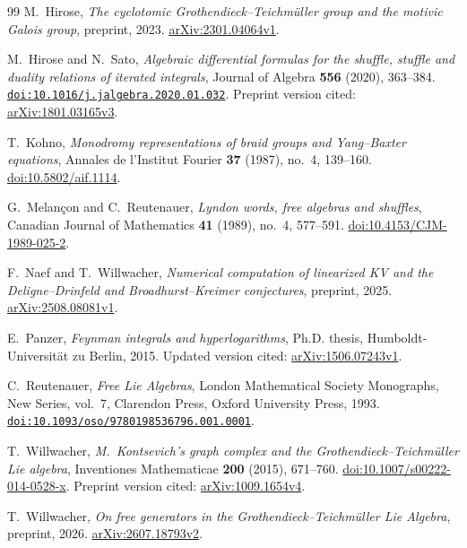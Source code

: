 \begin{thebibliography}{99}
M.~Hirose,
\emph{The cyclotomic Grothendieck--Teichm\"uller group and the motivic
Galois group},
preprint, 2023.
\href{https://arxiv.org/abs/2301.04064v1}{arXiv:2301.04064v1}.

M.~Hirose and N.~Sato,
\emph{Algebraic differential formulas for the shuffle, stuffle and duality
relations of iterated integrals},
Journal of Algebra \textbf{556} (2020), 363--384.
\href{https://doi.org/10.1016/j.jalgebra.2020.01.032}{\nolinkurl{doi:10.1016/j.jalgebra.2020.01.032}}.
Preprint version cited:
\href{https://arxiv.org/abs/1801.03165v3}{arXiv:1801.03165v3}.

T.~Kohno,
\emph{Monodromy representations of braid groups and Yang--Baxter equations},
Annales de l'Institut Fourier \textbf{37} (1987), no.~4, 139--160.
\href{https://doi.org/10.5802/aif.1114}{doi:10.5802/aif.1114}.

G.~Melan\c{c}on and C.~Reutenauer,
\emph{Lyndon words, free algebras and shuffles},
Canadian Journal of Mathematics \textbf{41} (1989), no.~4, 577--591.
\href{https://doi.org/10.4153/CJM-1989-025-2}{doi:10.4153/CJM-1989-025-2}.

F.~Naef and T.~Willwacher,
\emph{Numerical computation of linearized KV and the Deligne--Drinfeld and
Broadhurst--Kreimer conjectures},
preprint, 2025.
\href{https://arxiv.org/abs/2508.08081v1}{arXiv:2508.08081v1}.

E.~Panzer,
\emph{Feynman integrals and hyperlogarithms},
Ph.D. thesis, Humboldt-Universit\"at zu Berlin, 2015.
Updated version cited:
\href{https://arxiv.org/abs/1506.07243v1}{arXiv:1506.07243v1}.

C.~Reutenauer,
\emph{Free Lie Algebras},
London Mathematical Society Monographs, New Series, vol.~7,
Clarendon Press, Oxford University Press, 1993.
\newline
\href{https://doi.org/10.1093/oso/9780198536796.001.0001}{\nolinkurl{doi:10.1093/oso/9780198536796.001.0001}}.

T.~Willwacher,
\emph{M.~Kontsevich's graph complex and the Grothendieck--Teichm\"uller
Lie algebra},
Inventiones Mathematicae \textbf{200} (2015), 671--760.
\href{https://doi.org/10.1007/s00222-014-0528-x}{doi:10.1007/s00222-014-0528-x}.
Preprint version cited:
\href{https://arxiv.org/abs/1009.1654v4}{arXiv:1009.1654v4}.

T.~Willwacher,
\emph{On free generators in the Grothendieck--Teichm\"uller Lie Algebra},
preprint, 2026.
\href{https://arxiv.org/abs/2607.18793v2}{arXiv:2607.18793v2}.

\end{thebibliography}

